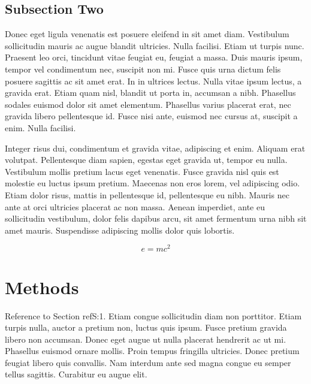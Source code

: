 \documentclass[preprint,12pt]{elsarticle}
\begin{document}
\subsection{Subsection Two}

Donec eget ligula venenatis est posuere eleifend in sit amet diam. Vestibulum sollicitudin mauris ac augue blandit ultricies. Nulla facilisi. Etiam ut turpis nunc. Praesent leo orci, tincidunt vitae feugiat eu, feugiat a massa. Duis mauris ipsum, tempor vel condimentum nec, suscipit non mi. Fusce quis urna dictum felis posuere sagittis ac sit amet erat. In in ultrices lectus. Nulla vitae ipsum lectus, a gravida erat. Etiam quam nisl, blandit ut porta in, accumsan a nibh. Phasellus sodales euismod dolor sit amet elementum. Phasellus varius placerat erat, nec gravida libero pellentesque id. Fusce nisi ante, euismod nec cursus at, suscipit a enim. Nulla facilisi.


Integer risus dui, condimentum et gravida vitae, adipiscing et enim. Aliquam erat volutpat. Pellentesque diam sapien, egestas eget gravida ut, tempor eu nulla. Vestibulum mollis pretium lacus eget venenatis. Fusce gravida nisl quis est molestie eu luctus ipsum pretium. Maecenas non eros lorem, vel adipiscing odio. Etiam dolor risus, mattis in pellentesque id, pellentesque eu nibh. Mauris nec ante at orci ultricies placerat ac non massa. Aenean imperdiet, ante eu sollicitudin vestibulum, dolor felis dapibus arcu, sit amet fermentum urna nibh sit amet mauris. Suspendisse adipiscing mollis dolor quis lobortis.

\begin{equation}
\label{eq:emc}
e = mc^2
\end{equation}

\section{Methods}
\label{Methods}

Reference to Section ref{S:1}. Etiam congue sollicitudin diam non porttitor. Etiam turpis nulla, auctor a pretium non, luctus quis ipsum. Fusce pretium gravida libero non accumsan. Donec eget augue ut nulla placerat hendrerit ac ut mi. Phasellus euismod ornare mollis. Proin tempus fringilla ultricies. Donec pretium feugiat libero quis convallis. Nam interdum ante sed magna congue eu semper tellus sagittis. Curabitur eu augue elit.
\end{document}
